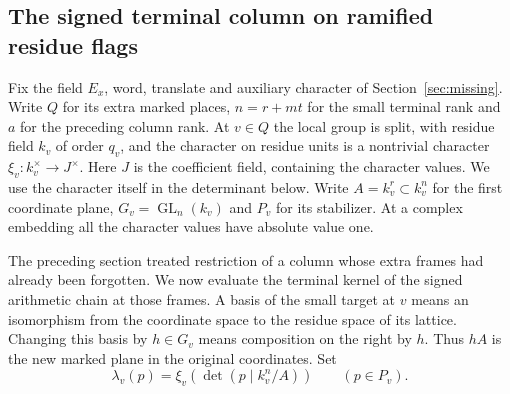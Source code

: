 \documentclass[a4paper,11pt]{article}
\theoremstyle{definition}
\theoremstyle{remark}
\numberwithin{equation}{section}
\newcommand{\GL}{\operatorname{GL}}
\begin{document}
\subsection{The signed terminal column on ramified residue flags}
\label{sec:ramifiedplanes383}

Fix the field \(E_x\), word, translate and auxiliary character of
Section~\ref{sec:missing}. Write \(Q\) for its extra marked places,
\(n=r+mt\) for the small terminal rank and \(a\) for the preceding
column rank. At \(v\in Q\) the local group is split, with residue
field \(k_v\) of order \(q_v\), and the character on residue units
is a nontrivial character \(\xi_v:k_v^\times\to J^\times\).
Here \(J\) is the coefficient field, containing the character
values. We use the character itself in the determinant below.
Write \(A=k_v^r\subset k_v^n\) for the first coordinate plane,
\(G_v=\GL_n(k_v)\) and \(P_v\) for its stabilizer. At a complex
embedding all the character values have absolute value one.

The preceding section treated restriction of a column whose extra
frames had already been forgotten. We now evaluate the terminal
kernel of the signed arithmetic chain at those frames. A basis
of the small target at \(v\) means an isomorphism from the
coordinate space to the residue space of its lattice. Changing
this basis by \(h\in G_v\) means composition on the right by
\(h\). Thus \(hA\) is the new marked plane in the original
coordinates. Set
\[
       \lambda_v(p)=\xi_v\!\left(\det(p\mid k_v^n/A)\right)
       \qquad(p\in P_v).
\]
\end{document}
